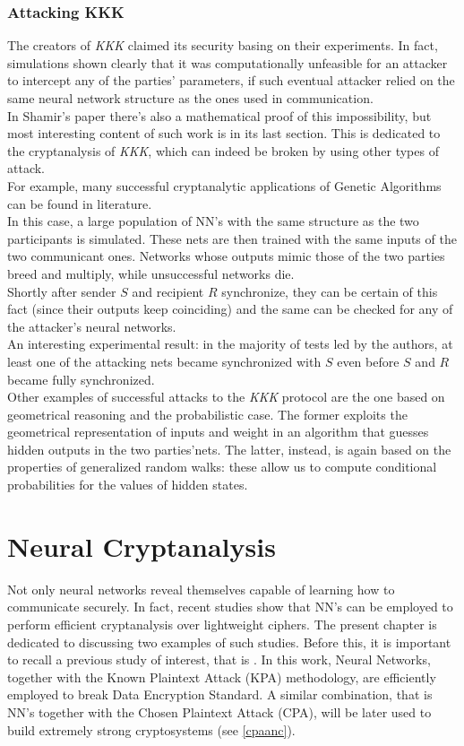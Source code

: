 \documentclass[%
    corpo=11pt,
    twoside,
    stile=classica,
    oldstyle,
    autoretitolo,
    tipotesi=magistrale,
    greek,
    evenboxes,
    english
]{toptesi}
\begin{document}
\subsection{Attacking KKK}
\label{ssc:atk}
The creators of \textit{KKK} claimed its security basing on their experiments. In fact, simulations shown clearly that it was computationally unfeasible for an attacker to intercept any of the parties' parameters, if such eventual attacker relied on the same neural network structure as the ones used in communication. \\
In Shamir's paper there's also a mathematical proof of this impossibility, but most interesting content of such work is in its last section. This is dedicated to the cryptanalysis of \textit{KKK}, which can indeed be broken by using other types of attack. \\
For example, many successful cryptanalytic applications of Genetic Algorithms can be found in literature. \\
In this case, a large population of NN's with the same structure as the two participants is simulated. These nets are then trained with the same inputs of the two communicant ones. Networks whose outputs mimic those of the two parties breed and multiply, while unsuccessful networks die. \\
Shortly after sender $S$ and recipient $R$ synchronize, they can be certain of this fact (since their outputs keep coinciding) and the same can be checked for any of the attacker's neural networks. \\
An interesting experimental result: in the majority of tests led by the authors, at least one  of the attacking nets became synchronized with $S$ even before $S$ and $R$ became fully synchronized. \\
Other examples of successful attacks to the \textit{KKK} protocol are the one based on geometrical reasoning and the probabilistic case. The former exploits the geometrical representation of inputs and weight in an algorithm that guesses hidden outputs in the two parties'nets. The latter, instead, is again based on the properties of generalized random walks: these allow us to compute conditional probabilities for the values of hidden states.

\chapter{Neural Cryptanalysis}
Not only neural networks reveal themselves capable of learning how to communicate securely. In fact, recent studies show that NN's can be employed to perform efficient cryptanalysis over lightweight ciphers. The present chapter is dedicated to discussing two examples of such studies. Before this, it is important to recall a previous study of interest, that is \cite{alani}. In this work, Neural Networks, together with the Known Plaintext Attack (KPA) methodology, are efficiently employed to break Data Encryption Standard. A similar combination, that is NN's together with the Chosen Plaintext Attack (CPA), will be later used to build extremely strong cryptosystems (see \ref{cpaanc}). \\
\end{document}
